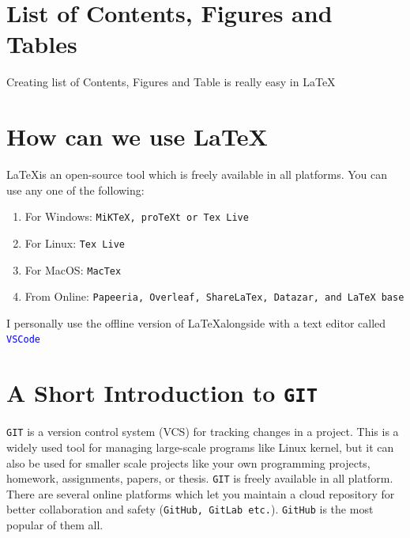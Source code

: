 \documentclass[a4paper, 12pt, one column]{article}
\begin{document}
\section{List of Contents,  Figures and Tables}


 {
        {
        \begin{minipage}{0.9\textwidth}
            \centering
        Creating list of Contents, Figures and Table is really easy in \LaTeX
        \end{minipage}
        }
    }
\tableofcontents
\listoffigures
\listoftables



\section{How can we use \LaTeX}
\LaTeX \space is an open-source tool which is freely available in all platforms. You can use any one of the following: 
\begin{enumerate}
    \item For Windows: \texttt{MiKTeX, proTeXt or Tex Live}
    \item For Linux: \texttt{Tex Live}
    \item For MacOS: \texttt{MacTex}
    \item From Online: \texttt{Papeeria, Overleaf, ShareLaTex, Datazar, and LaTeX base}
\end{enumerate}

\vspace{0.3cm}
 {
        {
        \begin{minipage}{0.9\textwidth}
            \centering
        I personally use the offline version of \LaTeX \space alongside with a text editor called \textcolor{blue}{ \texttt{VSCode}}
        \end{minipage}
        }
    }

\section{A Short Introduction to \texttt{GIT}}

\texttt{GIT} is a version control system (VCS) for tracking changes in a project. This is a widely used tool for managing large-scale programs like Linux kernel, but it can also be used for smaller scale projects like your own programming projects, homework, assignments, papers, or thesis. \texttt{GIT} is freely available in all platform. There are several online platforms which let you maintain a cloud repository for better collaboration and safety (\texttt{GitHub, GitLab etc.}). \texttt{GitHub} is the most popular of them all. 
\end{document}
